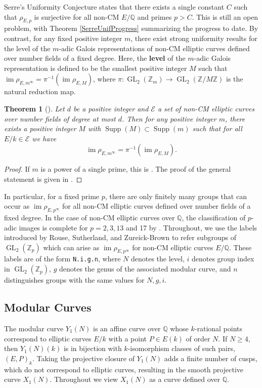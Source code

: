 \documentclass{amsart}
\newtheorem{theorem}{Theorem}
\theoremstyle{definition}
\newcommand{\Q}{\mathbb{Q}}
\newcommand{\Z}{\mathbb{Z}}
\newcommand{\GL}{\operatorname{GL}}
\newcommand{\Supp}{\operatorname{Supp}}
\DeclareMathOperator{\im}{im}
\newcommand{\calE}{{\mathcal E}}
\begin{document}
Serre's Uniformity Conjecture states that there exists a single constant $C$ such that $\rho_{E,p}$ is surjective for all non-CM $E/\Q$ and primes $p>C$. This is still an open problem, with Theorem \ref{SerreUnifProgress} summarizing the  progress to date. By contrast, for any fixed positive integer $m$, there exist strong uniformity results for the level of the $m$-adic Galois representations of non-CM elliptic curves defined over number fields of a fixed degree. Here, the \textbf{level} of the $m$-adic Galois representation is defined to be the smallest positive integer $M$ such that $\im \rho_{E,m^{\infty}}=\pi^{-1}(\im \rho_{E,M})$, where $\pi: \GL_2(\Z_m) \rightarrow \GL_2(\Z/M\Z)$ is the natural reduction map.
\begin{theorem}[\cite{CT13,BELOV}]\label{prop:UniformLevelFiniteSetPrimes}
		Let $d$ be a positive integer and $\calE$ a set of non-CM elliptic curves over number fields of degree at most $d$.
Then for any positive integer $m$, there exists a  positive integer $M$ with $\Supp(M) \subset \Supp(m)$ such that for all $E/k \in \calE$ we have
            \[
				\im \rho_{E, m^{\infty}} = \pi^{-1}(\im \rho_{E, M}).
            \]
\end{theorem}

\begin{proof}
    If $m$ is a power of a single prime, this is \cite[Theorem 1.1]{CT13}. The proof of the general statement is given in \cite[Proposition 6.1]{BELOV}.
\end{proof}

In particular, for a fixed prime $p$, there are only finitely many groups that can occur as $\im \rho_{E,p^{\infty}}$ for all non-CM elliptic curves defined over number fields of a fixed degree. In the case of non-CM elliptic curves over $\Q$, the classification of $p$-adic images is complete for $p=2,3, 13$ and 17 by \cite{2adicImage,RouseSutherlandZB22,3adicImage}. Throughout, we use the labels introduced by Rouse, Sutherland, and Zureick-Brown \cite{RouseSutherlandZB22} to refer subgroups of $\GL_2(\Z_p)$ which can arise as $\im \rho_{E,p^{\infty}}$ for non-CM elliptic curves $E/\Q$. These labels are of the form \texttt{N.i.g.n}, where $N$ denotes the level, $i$ denotes group index in $\GL_2(\Z_p)$, $g$ denotes the genus of the associated modular curve, and $n$ distinguishes groups with the same values for $N,g,i$.


\subsection{Modular Curves} The modular curve $Y_1(N)$ is an affine curve over $\Q$ whose $k$-rational points correspond to elliptic curves $E/k$ with a point $P \in E(k)$ of order $N$. If $N \geq 4$, then $Y_1(N)(k)$ is in bijection with $k$-isomorphism classes of such pairs, $(E,P)_k$. Taking the projective closure of $Y_1(N)$ adds a finite number of cusps, which do not correspond to elliptic curves, resulting in the smooth projective curve $X_1(N)$.   Throughout we view $X_1(N)$ as a curve defined over $\Q$.
\end{document}
